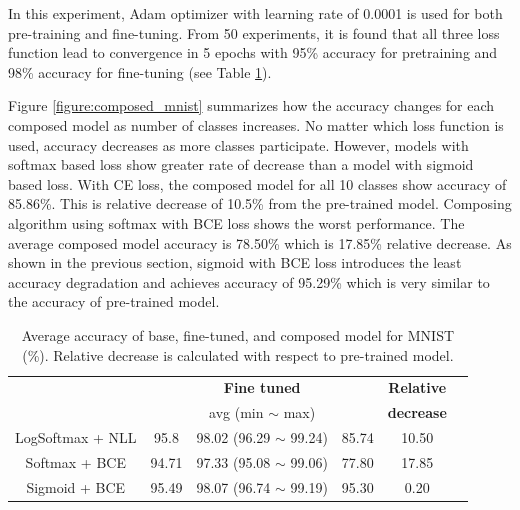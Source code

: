 \documentclass{article}
\begin{document}
In this experiment, Adam optimizer with learning rate of 0.0001 is used for both pre-training and fine-tuning. From 50 experiments, it is found that all three loss function lead to convergence in 5 epochs with 95\% accuracy for pretraining and 98\% accuracy for fine-tuning (see Table \ref{table:mnist}).

Figure \ref{figure:composed_mnist} summarizes how the accuracy changes for each composed model as number of classes increases. No matter which loss function is used, accuracy decreases as more classes participate. However, models with softmax based loss show greater rate of decrease than a model with sigmoid based loss. With CE loss, the composed model for all 10 classes show accuracy of 85.86\%. This is relative decrease of 10.5\% from the pre-trained model. Composing algorithm using softmax with BCE loss shows the worst performance. The average composed model accuracy is 78.50\% which is 17.85\% relative decrease. As shown in the previous section, sigmoid with BCE loss introduces the least accuracy degradation and achieves accuracy of 95.29\% which is very similar to the accuracy of pre-trained model.

\begin{table}[t]
    \centering
    \begin{tabular}{cccccc}
        \toprule[1pt]
        \multirow{2}{*}{\raisebox{-3\heavyrulewidth}{\bf Loss function}} &
        \multirow{2}{*}{\raisebox{-3\heavyrulewidth}{\bf Pre-trained }} &
        \textbf{Fine tuned} &
        \multirow{2}{*}{\raisebox{-3\heavyrulewidth}{ \bf Composed }} &
        \textbf{ Relative } \\
        & & avg (min $\sim$ max) & & \textbf{ decrease } \\
        \midrule
        LogSoftmax + NLL & 95.8 & 98.02 (96.29 $\sim$ 99.24) & 85.74 & 10.50 \\
        Softmax + BCE & 94.71 & 97.33 (95.08 $\sim$ 99.06) & 77.80 & 17.85 \\
        Sigmoid + BCE & 95.49 & 98.07 (96.74 $\sim$ 99.19) & 95.30 & 0.20 \\
        \bottomrule[1pt]
    \end{tabular}
    \caption{Average accuracy of base, fine-tuned, and composed model for MNIST (\%). Relative decrease is calculated with respect to pre-trained model.}
    \label{table:mnist}
\end{table}
\end{document}
